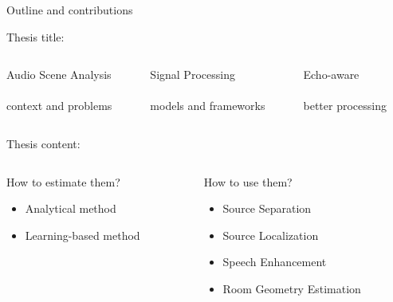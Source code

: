 \begin{frame}{Outline and contributions}

    \begin{block}{Thesis title:}

        \vspace*{2mm}
        \begin{columns}[onlytextwidth]
            \begin{column}[T]{0.3\linewidth}
                \centering
                \alert{Audio Scene Analysis}
                \\\downarrow
                \\context and problems
            \end{column}\hfill\pause
            \begin{column}[T]{0.3\linewidth}
                \centering
                \alert{Signal Processing}
                \\\downarrow
                \\models and frameworks
            \end{column}\hfill\pause
            \begin{column}[T]{0.3\linewidth}
                \centering
                \alert{Echo-aware}
                \\\downarrow
                \\better processing
            \end{column}\hfill
        \end{columns}
    \end{block}
    \pause

    \vfill
    \begin{block}{Thesis content:}

        \vspace*{2mm}
        \begin{columns}[T,onlytextwidth]
        \begin{column}{0.48\textwidth}
            \centering
            \alert{How to estimate them?}
            \begin{itemize}
                \item Analytical method
                \item Learning-based method
            \end{itemize}
        \end{column}
        \begin{column}{0.48\textwidth}
            \centering
            \alert{How to use them?}
            \begin{itemize}
                \item Source Separation
                \item Source Localization
                \item Speech Enhancement
                \item Room Geometry Estimation
            \end{itemize}
        \end{column}
    \end{columns}


\end{block}
\end{frame}
